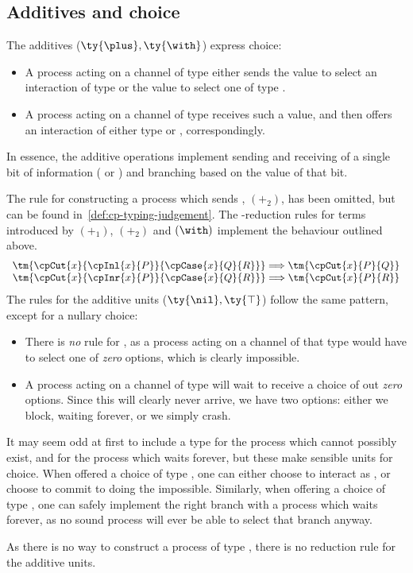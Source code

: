 \documentclass[UKenglish]{llncs}
\begin{document}
\subsection{Additives and choice}
\label{sec:cp-additives}
The additives ($\ty{\plus}, \ty{\with}$) express choice:
\begin{itemize}
\item
  A process acting on a channel of type  either sends the value
   to select an interaction of type  or the value
   to select one of type . 
\item
  A process acting on a channel of type  receives such a value,
  and then offers an interaction of either type  or ,
  correspondingly.
\end{itemize}
In essence, the additive operations implement sending and receiving of a single
bit of information ( or ) and branching based on
the value of that bit. 
\begin{center}
  \cpInfWith
\end{center}
The rule for constructing a process which sends , $(\plus_2)$,
has been omitted, but can be found in~\cref{def:cp-typing-judgement}.
The \textbeta-reduction rules for terms introduced by $(\plus_1)$, $(\plus_2)$
and $(\with)$ implement the behaviour outlined above.
\[
  \begin{array}{c}
    \tm{\cpCut{x}{\cpInl{x}{P}}{\cpCase{x}{Q}{R}}} \Longrightarrow \tm{\cpCut{x}{P}{Q}}
    \\
    \tm{\cpCut{x}{\cpInr{x}{P}}{\cpCase{x}{Q}{R}}} \Longrightarrow \tm{\cpCut{x}{P}{R}}
  \end{array}
\]
%
The rules for the additive units ($\ty{\nil}, \ty{\top}$) follow the same
pattern, except for a nullary choice:
\begin{itemize}
\item
  There is \emph{no} rule for \ty{\nil}, as a process acting on a channel of
  that type would have to select one of \emph{zero} options, which is clearly
  impossible.
\item
  A process acting on a channel of type \ty{\top} will wait to receive a choice
  of out \emph{zero} options. Since this will clearly never arrive, we have two
  options: either we block, waiting forever, or we simply crash.
\end{itemize}
It may seem odd at first to include a type for the process which cannot possibly
exist, and for the process which waits forever, but these make sensible units
for choice.
When offered a choice of type , one can either choose to
interact as , or choose to commit to doing the impossible.
Similarly, when offering a choice of type , one can safely
implement the right branch with a process which waits forever, as no sound
process will ever be able to select that branch anyway.
\begin{center}
  \cpInfNil
  \cpInfTop
\end{center}
As there is no way to construct a process of type \ty{\nil}, there is no
reduction rule for the additive units.
\end{document}
